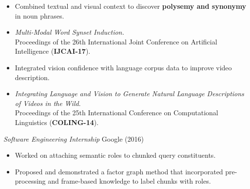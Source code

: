 \documentclass{res}
\newcommand{\reducevspace}{\vspace{-4pt}}
\begin{document}
\begin{resume}
  \begin{itemize} \itemsep -2pt
  \item Combined textual and visual context to discover \textbf{polysemy and synonymy} in noun phrases.
  \item \textit{Multi-Modal Word Synset Induction.} \\
  Proceedings of the 26th International Joint Conference on Artificial Intelligence (\textbf{IJCAI-17}).
  \item Integrated vision confidence with language corpus data to improve video description.
  \item \textit{Integrating Language and Vision to Generate Natural Language Descriptions of Videos in the Wild}. \\ 
  Proceedings of the 25th International Conference on Computational Linguistics (\textbf{COLING-14}).
\end{itemize}
%
\reducevspace
{\sl Software Engineering Internship} \hfill Google (2016)

  \begin{itemize} \itemsep -2pt
  \item Worked on attaching semantic roles to chunked query constituents.
  \item Proposed and demonstrated a factor graph method that incorporated pre-processing and frame-based knowledge to label chunks with roles.
 \end{itemize}
%
 
\end{resume} 
\end{document}
